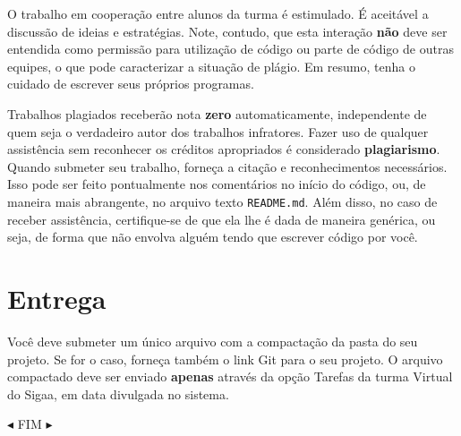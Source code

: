 \documentclass[11pt,a4paper]{article}
\begin{document}
O trabalho em cooperação entre alunos da turma é estimulado.
É aceitável a discussão de ideias e estratégias.
Note, contudo, que esta interação \textbf{não} deve ser entendida como permissão
para utilização de código ou parte de código de outras equipes,
o que pode caracterizar a situação de plágio.
Em resumo, tenha o cuidado de escrever seus próprios programas.

Trabalhos plagiados receberão nota \textbf{zero} automaticamente,
independente de quem seja o verdadeiro autor dos trabalhos infratores.
Fazer uso de qualquer assistência sem reconhecer os créditos apropriados
é considerado \textbf{plagiarismo}.
Quando submeter seu trabalho, forneça a citação e reconhecimentos necessários.
Isso pode ser feito pontualmente nos comentários no início do código, ou,
de maneira mais abrangente, no arquivo texto \texttt{README.md}.
Além disso, no caso de receber assistência, certifique-se de que ela lhe
é dada de maneira genérica, ou seja, de forma que não envolva alguém
tendo que escrever código por você.


\section{Entrega}
\label{sec:entrega}

Você deve submeter um único arquivo com a compactação da pasta do seu projeto.
Se for o caso, forneça também o link Git para o seu projeto.
O arquivo compactado deve ser enviado \textbf{apenas} através da opção Tarefas
da turma Virtual do Sigaa, em data divulgada no sistema.



\center $\blacktriangleleft$  FIM $\blacktriangleright$
\end{document}
